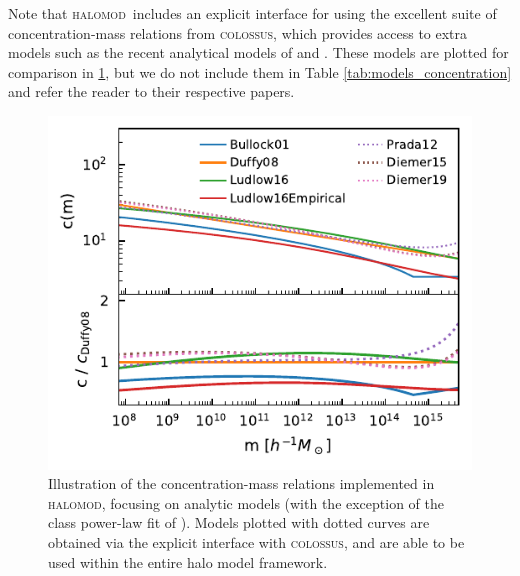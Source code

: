 \documentclass[5p,aas_macros]{elsarticle}
\newcommand{\halomod}{\textsc{halomod}}
\newcommand{\bd}[1]{\textcolor{purple}{\textbf{[BD: #1]}}}
\newcommand{\sgm}[1]{\textcolor{green}{\textbf{[SM: #1]}}}
\begin{document}
Note that \halomod\ includes an explicit interface for using the excellent suite of concentration-mass relations from \textsc{colossus}, which provides access to extra models such as the recent analytical models of \cite{Prada2012} and \cite{Diemer2019}. These models are plotted for comparison in \ref{fig:concentration}, but we do not include them in Table \ref{tab:models_concentration} and refer the reader to their respective papers.





\begin{figure}
  \centering
  \includegraphics[width=\linewidth]{figures/halo_concentration_models.pdf}
  \caption[Concentration-mass-redshift relation for various models in the literature]{Illustration of the concentration-mass relations implemented in \halomod, focusing on analytic models (with the exception of the class power-law fit of \cite{Duffy2008}). Models plotted with dotted curves are obtained via the explicit interface with \textsc{colossus}, and are able to be used within the entire halo model framework. }
  \label{fig:concentration}
\end{figure}
\end{document}
